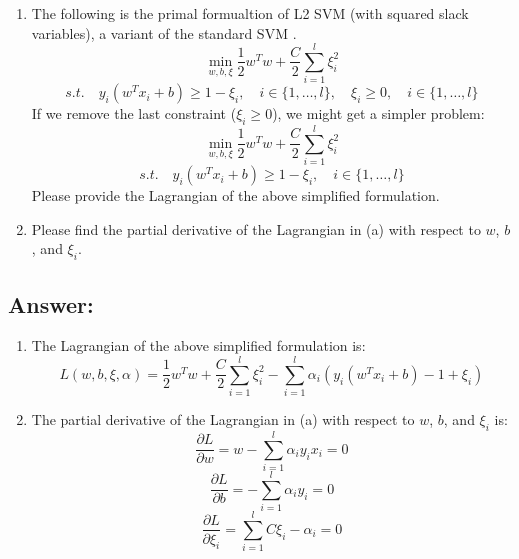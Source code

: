 \documentclass{article}
\begin{document}
\begin{enumerate}[label= (\alph*)]
    \item The following is the primal formualtion of L2 SVM (with squared slack variables), a variant of the standard SVM \@.
    \begin{equation}
        \min_{w,b,\xi} \frac{1}{2}w^{T}w + \frac{C}{2}\sum_{i=1}^{l}\xi_i^2
    \end{equation}
    \begin{equation}
        s.t. \quad y_i(w^{T}x_i + b) \ge 1 - \xi_i, \quad i \in \{1,\ldots,l\}, \quad \xi_i \ge 0, \quad i \in \{1,\ldots,l\}
    \end{equation}
    If we remove the last constraint ($\xi_i \ge 0$), we might get a simpler problem:
    \begin{equation}
        \min_{w,b,\xi} \frac{1}{2}w^{T}w + \frac{C}{2}\sum_{i=1}^{l}\xi_i^2
    \end{equation}
    \begin{equation}
        s.t. \quad y_i(w^{T}x_i + b) \ge 1 - \xi_i, \quad i \in \{1,\ldots,l\}
    \end{equation}
    Please provide the Lagrangian of the above simplified formulation.
    \item Please find the partial derivative of the Lagrangian in (a) with respect to $w$, $b$, and $\xi_i$.
\end{enumerate}

\subsection*{Answer:}
\begin{enumerate}
    \item The Lagrangian of the above simplified formulation is:
    \begin{equation}
        L(w,b,\xi,\alpha) = \frac{1}{2}w^{T}w + \frac{C}{2}\sum_{i=1}^{l}\xi_i^2 - \sum_{i=1}^{l}\alpha_i(y_i(w^{T}x_i + b) - 1 + \xi_i)
    \end{equation}

    \item The partial derivative of the Lagrangian in (a) with respect to $w$, $b$, and $\xi_i$ is:
    \begin{equation}
        \frac{\partial L}{\partial w} = w - \sum_{i=1}^{l}\alpha_i y_i x_i = 0
    \end{equation}
    \begin{equation}
        \frac{\partial L}{\partial b} = -\sum_{i=1}^{l}\alpha_i y_i = 0
    \end{equation}
    \begin{equation}
        \frac{\partial L}{\partial \xi_i} = \sum_{i=1}^{l}C \xi_i - \alpha_i = 0
    \end{equation}
\end{enumerate}
\end{document}
